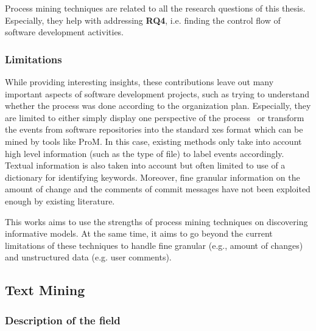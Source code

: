 \documentclass[a4paper,11pt]{article}
\begin{document}
Process mining techniques are related to all the research questions of this thesis. Especially, they help with addressing \textbf{RQ4}, i.e. finding the control flow of software development activities.

\subsubsection{Limitations} 
While providing interesting insights, these contributions leave out many important aspects of software development projects, such as trying to understand whether the process was done according to the organization plan. Especially, they are limited to either simply display one perspective of the process~\cite{Song2007} or transform the events from software repositories into the standard \gls{xes} format which can be mined by tools like ProM. In this case, existing methods only take into account high level information (such as the type of file) to label events accordingly. Textual information is also taken into account \cite{rubin2007process} but often limited to use of a dictionary for identifying keywords. Moreover, fine granular information on the amount of change and the comments of commit messages have not been exploited enough by existing literature.

This works aims to use the strengths of process mining techniques on discovering informative models. At the same time, it aims to go beyond the current limitations of these techniques to handle fine granular (e.g., amount of changes) and unstructured data (e.g. user comments).


\subsection{Text Mining}
\label{sec:text-mining}


\subsubsection{Description of the field} 
\end{document}
